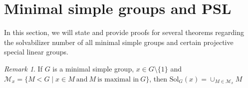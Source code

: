 \documentclass{amsart}
\newcommand{\Solv}{\text{Sol}}
\newtheorem{theorem}{Theorem}[section]
\newtheorem{corollary}[theorem]{Corollary}
\theoremstyle{definition}
\theoremstyle{remark}
\newtheorem{remark}[theorem]{Remark}
\begin{document}
\section{Minimal simple groups and PSL} \label{minimal simple}

In this section, we will state and provide proofs for several theorems regarding the solvabilizer number of all minimal simple groups and certain projective special linear groups.

\begin{remark}\label{Solminimalsimple}
	If $G$ is a minimal simple group,  $x\in G\setminus\{1\}$  and $\mathscr{M}_x=\{ M<G\mid x\in M\ \text{and}\  M \ \text{is maximal in}\ G\}$, then $\Solv_G(x)=\cup_{M\in\mathscr{M}_x}M$
\end{remark}
\end{document}
